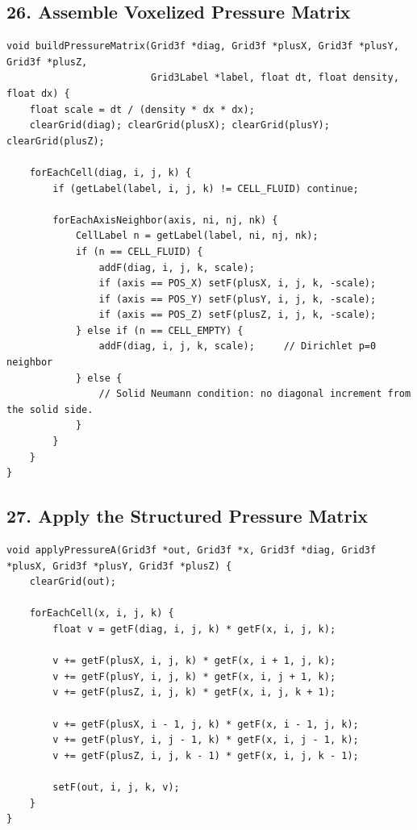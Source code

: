 \documentclass[10pt,letterpaper]{article}
\begin{document}
\subsection*{26. Assemble Voxelized Pressure Matrix}

\begin{verbatim}
void buildPressureMatrix(Grid3f *diag, Grid3f *plusX, Grid3f *plusY, Grid3f *plusZ,
                         Grid3Label *label, float dt, float density, float dx) {
    float scale = dt / (density * dx * dx);
    clearGrid(diag); clearGrid(plusX); clearGrid(plusY); clearGrid(plusZ);

    forEachCell(diag, i, j, k) {
        if (getLabel(label, i, j, k) != CELL_FLUID) continue;

        forEachAxisNeighbor(axis, ni, nj, nk) {
            CellLabel n = getLabel(label, ni, nj, nk);
            if (n == CELL_FLUID) {
                addF(diag, i, j, k, scale);
                if (axis == POS_X) setF(plusX, i, j, k, -scale);
                if (axis == POS_Y) setF(plusY, i, j, k, -scale);
                if (axis == POS_Z) setF(plusZ, i, j, k, -scale);
            } else if (n == CELL_EMPTY) {
                addF(diag, i, j, k, scale);     // Dirichlet p=0 neighbor
            } else {
                // Solid Neumann condition: no diagonal increment from the solid side.
            }
        }
    }
}
\end{verbatim}

\subsection*{27. Apply the Structured Pressure Matrix}

\begin{verbatim}
void applyPressureA(Grid3f *out, Grid3f *x, Grid3f *diag, Grid3f *plusX, Grid3f *plusY, Grid3f *plusZ) {
    clearGrid(out);

    forEachCell(x, i, j, k) {
        float v = getF(diag, i, j, k) * getF(x, i, j, k);

        v += getF(plusX, i, j, k) * getF(x, i + 1, j, k);
        v += getF(plusY, i, j, k) * getF(x, i, j + 1, k);
        v += getF(plusZ, i, j, k) * getF(x, i, j, k + 1);

        v += getF(plusX, i - 1, j, k) * getF(x, i - 1, j, k);
        v += getF(plusY, i, j - 1, k) * getF(x, i, j - 1, k);
        v += getF(plusZ, i, j, k - 1) * getF(x, i, j, k - 1);

        setF(out, i, j, k, v);
    }
}
\end{verbatim}
\end{document}
